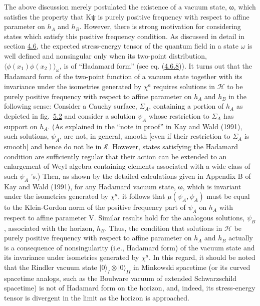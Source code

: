 \documentclass[11pt,a4paper]{article}
\begin{document}
The above discussion merely postulated the existence of a vacuum state, ω, which satisfies the property that Kψ is purely positive frequency with respect to affine parameter on \(h_A\) and \(h_B\). However, there is strong motivation for considering states which satisfy this positive frequency condition. As discussed in detail in section \hyperlink{sec:4.6}{4.6}, the expected stress-energy tensor of the quantum field in a state \(\omega\) is well defined and nonsingular only when its two-point distribution, \(\langle \phi(x_1)\phi(x_2)\rangle_{\omega}\), is of ``Hadamard form'' (see eq. (\hyperref[eq:4.6.8]{4.6.8})). It turns out that the Hadamard form of the two-point function of a vacuum state together with its invariance under the isometries generated by \(\chi^a\) requires solutions in \(\mathcal{H}\) to be purely positive frequency with respect to affine parameter on \(h_A\) and \(h_B\) in the following sense: Consider a Cauchy surface, \(\Sigma_A\), containing a portion of \(h_A\) as depicted in fig.~\hyperref[fig:5.2]{5.2} and consider a solution \(\psi_A\) whose restriction to \(\Sigma_A\) has support on \(h_A\). (As explained in the ``note in proof'' in Kay and Wald (1991), such solutions, \(\psi_A\), are not, in general, smooth {[}even if their restriction to \(\Sigma_A\) is smooth{]} and hence do not lie in \(\mathcal{S}\). However, states satisfying the Hadamard condition are sufficiently regular that their action can be extended to an enlargement of Weyl algebra containing elements associated with a wide class of such \(\psi_A\) 's.) Then, as shown by the detailed calculations given in Appendix B of Kay and Wald (1991), for any Hadamard vacuum state, ω, which is invariant under the isometries generated by \(\chi^a\), it follows that \(\mu(\psi_A,\psi_A)\) must be equal to the Klein-Gordon norm of the positive frequency part of \(\psi_A\) on \(h_A\) with respect to affine parameter V. Similar results hold for the analogous solutions, \(\psi_B\), associated with the horizon, \(h_B\). Thus, the condition that solutions in \(\mathcal{H}\) be purely positive frequency with respect to affine parameter on \(h_A\) and \(h_B\) \hypertarget{source-139}{} actually is a consequence of nonsingularity (i.e., Hadamard form) of the vacuum state and its invariance under isometries generated by \(\chi^a\). In this regard, it should be noted that the Rindler vacuum state \(\lvert 0\rangle _{I}\otimes \lvert 0\rangle _{II}\) in Minkowski spacetime (or its curved spacetime analogs, such as the Boulware vacuum of extended Schwarzschild spacetime) is not of Hadamard form on the horizon, and, indeed, its stress-energy tensor is divergent in the limit as the horizon is approached.
\end{document}
